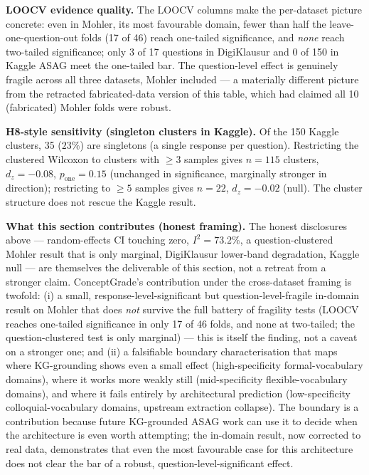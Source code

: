 \documentclass[conference]{IEEEtran}
\begin{document}
\textbf{LOOCV evidence quality.}
The LOOCV columns make the per-dataset picture concrete: even in Mohler,
its most favourable domain, fewer than half the leave-one-question-out
folds (17 of 46) reach one-tailed significance, and \emph{none} reach
two-tailed significance; only 3 of 17 questions in DigiKlausur and 0 of
150 in Kaggle ASAG meet the one-tailed bar. The question-level effect is
genuinely fragile across all three datasets, Mohler included --- a
materially different picture from the retracted fabricated-data version
of this table, which had claimed all 10 (fabricated) Mohler folds were
robust.

\textbf{H8-style sensitivity (singleton clusters in Kaggle).} Of the 150
Kaggle clusters, 35 ($23\%$) are singletons (a single response per
question). Restricting the clustered Wilcoxon to clusters with $\geq 3$
samples gives $n = 115$ clusters, $d_z = -0.08$, $p_{\text{one}} = 0.15$
(unchanged in significance, marginally stronger in direction);
restricting to $\geq 5$ samples gives $n = 22$, $d_z = -0.02$ (null).
The cluster structure does not rescue the Kaggle result.

\textbf{What this section contributes (honest framing).} The honest
disclosures above --- random-effects CI touching zero, $I^2 = 73.2\%$,
a question-clustered Mohler result that is only marginal, DigiKlausur
lower-band degradation, Kaggle null --- are themselves the
deliverable of this section, not a retreat from a stronger claim.
ConceptGrade's contribution under the cross-dataset framing is twofold:
(i) a small, response-level-significant but question-level-fragile
in-domain result on Mohler that does \emph{not} survive the full battery
of fragility tests (LOOCV reaches one-tailed significance in only 17 of
46 folds, and none at two-tailed; the question-clustered test is only
marginal) --- this is itself the finding, not a caveat on a stronger
one; and (ii) a falsifiable boundary characterisation that maps where
KG-grounding shows even a small effect (high-specificity formal-vocabulary
domains), where it works more weakly still (mid-specificity
flexible-vocabulary domains), and where it fails entirely by architectural
prediction (low-specificity colloquial-vocabulary domains, upstream
extraction collapse). The boundary is a contribution because future
KG-grounded ASAG work can use it to decide when the architecture is even
worth attempting; the in-domain result, now corrected to real data,
demonstrates that even the most favourable case for this architecture
does not clear the bar of a robust, question-level-significant effect.
\end{document}
